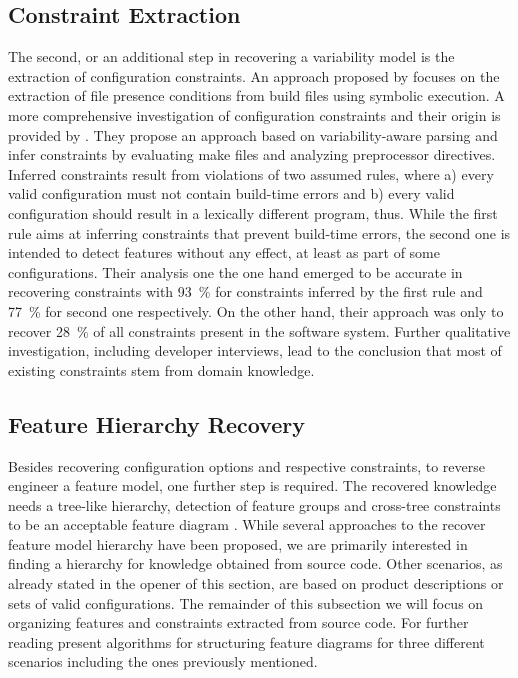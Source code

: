 \subsection{Constraint Extraction}
The second, or an additional step in recovering a variability model is the
extraction of configuration constraints. An approach proposed by \cite{zhou_extracting_2015}
focuses on the extraction of file presence conditions from build files using symbolic execution. A more comprehensive investigation of configuration
constraints and their origin is provided by \cite{nadi_mining_2014,nadi_where_2015}. They
propose an approach based on variability-aware parsing and infer constraints by
evaluating make files and  analyzing preprocessor directives. Inferred
constraints result from violations of two assumed rules, where a) every valid
configuration must not contain build-time errors and b) every valid
configuration should result in a lexically different program, thus. While the
first rule aims at inferring constraints that prevent build-time errors, the
second one is intended to detect features without any effect, at least as part
of some configurations. Their analysis one the one hand emerged to be accurate
in recovering constraints with 93~\% for constraints inferred by the first rule
and 77~\% for second one respectively. On the other hand, their approach was
only to recover 28~\% of all constraints present in the software system.
Further qualitative investigation, including developer interviews, lead to
the conclusion that most of existing constraints stem from domain knowledge.

\subsection{Feature Hierarchy Recovery} 
Besides recovering configuration options and respective constraints, to reverse
engineer a feature model, one further step is required. The recovered knowledge
needs a tree-like hierarchy, detection of feature groups and cross-tree
constraints to be an acceptable feature diagram
\citep{kang_feature-oriented_1990}. While several approaches to the recover feature model hierarchy have been proposed,
we are primarily interested in finding a hierarchy for knowledge obtained from
source code. Other scenarios, as already stated in the opener of this section,
are based on product descriptions or sets of valid configurations. The remainder of
this subsection we will focus on organizing features and constraints extracted
from source code. For further reading \cite{andersen_efficient_2012} present algorithms
for structuring feature diagrams for three different scenarios including the
ones previously mentioned.

